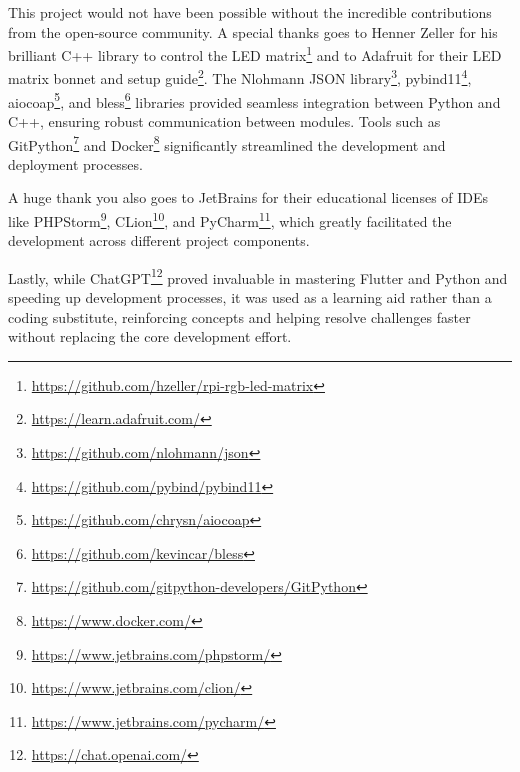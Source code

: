 This project would not have been possible without the incredible contributions from the open-source community. A special thanks goes to Henner Zeller for his brilliant C++ library to control the LED matrix\footnote{\url{https://github.com/hzeller/rpi-rgb-led-matrix}} and to Adafruit for their LED matrix bonnet and setup guide\footnote{\url{https://learn.adafruit.com/}}. The Nlohmann JSON library\footnote{\url{https://github.com/nlohmann/json}}, pybind11\footnote{\url{https://github.com/pybind/pybind11}}, aiocoap\footnote{\url{https://github.com/chrysn/aiocoap}}, and bless\footnote{\url{https://github.com/kevincar/bless}} libraries provided seamless integration between Python and C++, ensuring robust communication between modules. Tools such as GitPython\footnote{\url{https://github.com/gitpython-developers/GitPython}} and Docker\footnote{\url{https://www.docker.com/}} significantly streamlined the development and deployment processes.

A huge thank you also goes to JetBrains for their educational licenses of IDEs like PHPStorm\footnote{\url{https://www.jetbrains.com/phpstorm/}}, CLion\footnote{\url{https://www.jetbrains.com/clion/}}, and PyCharm\footnote{\url{https://www.jetbrains.com/pycharm/}}, which greatly facilitated the development across different project components.

Lastly, while ChatGPT\footnote{\url{https://chat.openai.com/}} proved invaluable in mastering Flutter and Python and speeding up development processes, it was used as a learning aid rather than a coding substitute, reinforcing concepts and helping resolve challenges faster without replacing the core development effort.